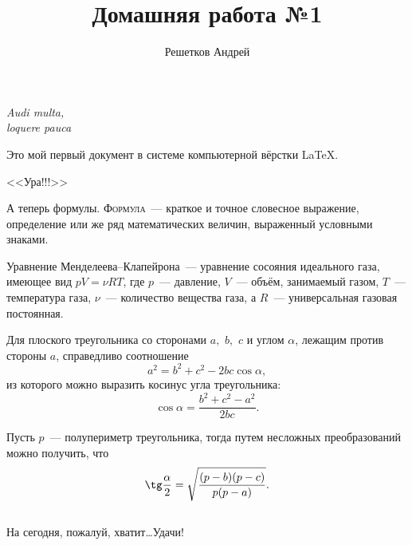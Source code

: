 \documentclass[12pt]{article}
\title{Домашняя работа №1}
\author{Решетков Андрей}
\date{}
\begin{document}
	\maketitle
	\begin{flushright}
		\textit{Audi multa,\\ loquere pauca}
	\end{flushright}
	
	\vspace{20pt}
	Это мой первый документ в системе компьютерной вёрстки \LaTeX.
	
	\begin{center}
		\huge \sffamily <<Ура!!!>>	
	\end{center}

	А теперь формулы. \textsc{Формула}~--- краткое и точное словесное выражение, определение или же ряд математических величин, выраженный условными знаками.
	\\[15pt]
	\par
	Уравнение Менделеева--Клапейрона~--- уравнение сосояния идеального газа, имеющее вид $pV = \nu RT$, где $p$~--- давление, $V$~--- объём, занимаемый газом, $T$~--- температура газа, $\nu$~--- количество вещества газа, а $R$~--- универсальная газовая постоянная.\\[15pt]
	
	Для плоского треугольника со сторонами $a,$ $b,$ $c$ и углом $\alpha$, лежащим против стороны $a$, справедливо соотношение
	$$
		a^2 = b^2 + c^2 - 2bc\cos\alpha,
	$$
	из которого можно выразить косинус угла треугольника:
	$$
		\cos\alpha = \frac{b^2 + c^2 - a^2}{2bc}.
	$$
	
	Пусть $p$~--- полупериметр треугольника, тогда путем несложных преобразований можно получить, что
	$$
		\tg\frac{\alpha}{2} = \sqrt{\frac{(p-b)(p-c)}{p(p-a)}}.
	$$	
	\\[1cm]
	На сегодня, пожалуй, хватит\dots Удачи!
\end{document}
